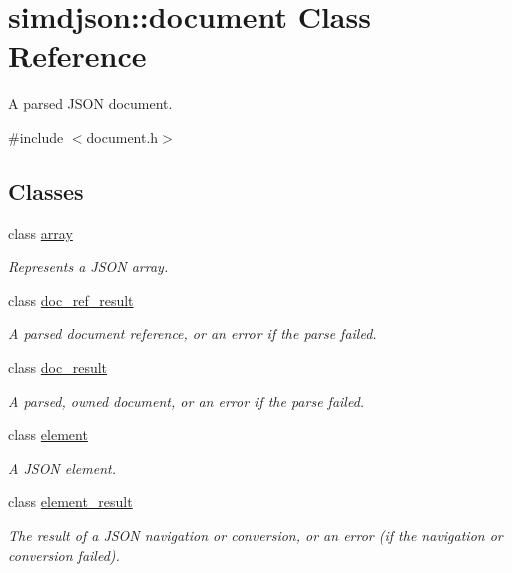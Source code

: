 \hypertarget{classsimdjson_1_1document}{}\section{simdjson\+:\+:document Class Reference}
\label{classsimdjson_1_1document}


A parsed J\+S\+ON document.  




{\ttfamily \#include $<$document.\+h$>$}

\subsection*{Classes}
\begin{DoxyCompactItemize}
\item 
class \hyperlink{classsimdjson_1_1document_1_1array}{array}
\begin{DoxyCompactList}\small\item\em Represents a J\+S\+ON array. \end{DoxyCompactList}\item 
class \hyperlink{classsimdjson_1_1document_1_1doc__ref__result}{doc\+\_\+ref\+\_\+result}
\begin{DoxyCompactList}\small\item\em A parsed document reference, or an error if the parse failed. \end{DoxyCompactList}\item 
class \hyperlink{classsimdjson_1_1document_1_1doc__result}{doc\+\_\+result}
\begin{DoxyCompactList}\small\item\em A parsed, {\itshape owned} document, or an error if the parse failed. \end{DoxyCompactList}\item 
class \hyperlink{classsimdjson_1_1document_1_1element}{element}
\begin{DoxyCompactList}\small\item\em A J\+S\+ON element. \end{DoxyCompactList}\item 
class \hyperlink{classsimdjson_1_1document_1_1element__result}{element\+\_\+result}
\begin{DoxyCompactList}\small\item\em The result of a J\+S\+ON navigation or conversion, or an error (if the navigation or conversion failed). \end{DoxyCompactList}\item 

\end{DoxyCompactItemize}
